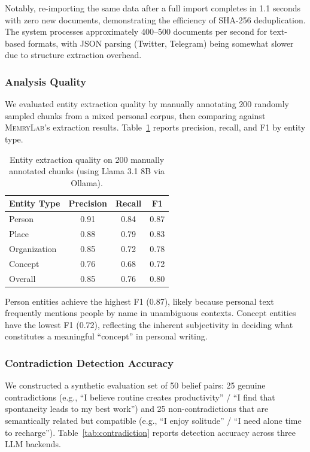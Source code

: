 \documentclass[manuscript,review]{acmart}
\begin{document}
Notably, re-importing the same data after a full import completes in 1.1 seconds with zero new documents, demonstrating the efficiency of SHA-256 deduplication.
The system processes approximately 400--500 documents per second for text-based formats, with JSON parsing (Twitter, Telegram) being somewhat slower due to structure extraction overhead.

\subsubsection{Analysis Quality}
We evaluated entity extraction quality by manually annotating 200 randomly sampled chunks from a mixed personal corpus, then comparing against \textsc{MemryLab}'s extraction results.
Table~\ref{tab:entity-quality} reports precision, recall, and F1 by entity type.

\begin{table}[t]
\caption{Entity extraction quality on 200 manually annotated chunks (using Llama 3.1 8B via Ollama).}
\label{tab:entity-quality}
\small
\begin{tabular}{lccc}
\toprule
\textbf{Entity Type} & \textbf{Precision} & \textbf{Recall} & \textbf{F1} \\
\midrule
Person       & 0.91 & 0.84 & 0.87 \\
Place        & 0.88 & 0.79 & 0.83 \\
Organization & 0.85 & 0.72 & 0.78 \\
Concept      & 0.76 & 0.68 & 0.72 \\
\midrule
Overall      & 0.85 & 0.76 & 0.80 \\
\bottomrule
\end{tabular}
\end{table}

Person entities achieve the highest F1 (0.87), likely because personal text frequently mentions people by name in unambiguous contexts.
Concept entities have the lowest F1 (0.72), reflecting the inherent subjectivity in deciding what constitutes a meaningful ``concept'' in personal writing.

\subsubsection{Contradiction Detection Accuracy}
We constructed a synthetic evaluation set of 50 belief pairs: 25 genuine contradictions (e.g., ``I believe routine creates productivity'' / ``I find that spontaneity leads to my best work'') and 25 non-contradictions that are semantically related but compatible (e.g., ``I enjoy solitude'' / ``I need alone time to recharge'').
Table~\ref{tab:contradiction} reports detection accuracy across three LLM backends.
\end{document}
